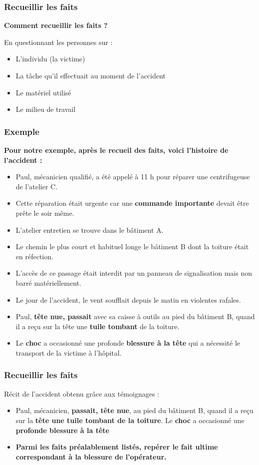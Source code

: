 \documentclass{beamer}
\begin{document}
\begin{frame}
\frametitle{Recueillir les faits}

\textbf{Comment recueillir les faits ?}

En questionnant les personnes sur :
\begin{itemize}
	\item L’individu (la victime)
\item La tâche qu’il effectuait au moment de l’accident
\item Le matériel utilisé
\item Le milieu de travail
\end{itemize}
\end{frame}

\begin{frame}
\frametitle{Exemple}

\textbf{Pour notre exemple, après le recueil des faits, voici l’histoire de l’accident :}
\begin{itemize}
	\item Paul, mécanicien qualifié, a été appelé à 11 h pour réparer une centrifugeuse de l’atelier C.
\item Cette réparation était urgente car une \textbf{commande importante} devait être prête le soir même.
\item L’atelier entretien se trouve dans le bâtiment A. 
\item Le chemin le plus court et habituel longe le bâtiment B dont la toiture était en réfection. 
\item L’accès de ce passage était interdit par un panneau de signalisation mais non barré matériellement. 
\item Le jour de l’accident, le vent soufflait depuis le matin en violentes rafales. 
\item Paul, \textbf{tête nue, passait} avec sa caisse à outils au pied du bâtiment B, quand il a reçu sur la tête une \textbf{tuile tombant} de la toiture. 
\item Le \textbf{choc} a occasionné une profonde \textbf{blessure à la tête} qui a nécessité le transport de la victime à l’hôpital.
\end{itemize}
\end{frame}

\begin{frame}
\frametitle{Recueillir les faits}

Récit de l’accident obtenu grâce aux témoignages :
\begin{itemize}
	\item Paul, mécanicien, \textbf{passait, tête nue}, au pied du bâtiment B, quand il a reçu sur la \textbf{tête une tuile tombant de la toiture}. Le \textbf{choc} a occasionné une \textbf{profonde blessure à la tête}

\item \textbf{Parmi les faits préalablement listés, repérer le fait ultime correspondant à la blessure de l’opérateur.}
\end{itemize}
\end{frame}
\end{document}

